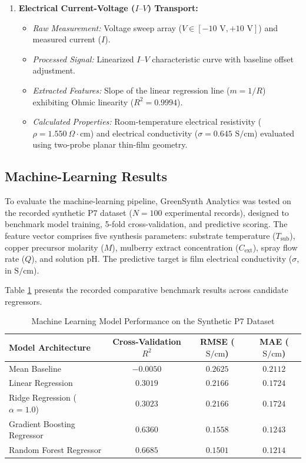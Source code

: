 \documentclass[12pt,a4paper,oneside]{report}
\begin{document}
{{{\begin{enumerate}
    \item \textbf{Electrical Current-Voltage ($I\text{--}V$) Transport:}
    \begin{itemize}
        \item \textit{Raw Measurement:} Voltage sweep array ($V \in [-10\text{ V}, +10\text{ V}]$) and measured current ($I$).
        \item \textit{Processed Signal:} Linearized $I\text{--}V$ characteristic curve with baseline offset adjustment.
        \item \textit{Extracted Features:} Slope of the linear regression line ($m = 1/R$) exhibiting Ohmic linearity ($R^2 = 0.9994$).
        \item \textit{Calculated Properties:} Room-temperature electrical resistivity ($\rho = 1.550\ \Omega\cdot\text{cm}$) and electrical conductivity ($\sigma = 0.645\text{ S/cm}$) evaluated using two-probe planar thin-film geometry.
    \end{itemize}
\end{enumerate}

\subsection{Machine-Learning Results}

To evaluate the machine-learning pipeline, GreenSynth Analytics was tested on the recorded synthetic P7 dataset ($N = 100$ experimental records), designed to benchmark model training, 5-fold cross-validation, and predictive scoring. The feature vector comprises five synthesis parameters: substrate temperature ($T_{\text{sub}}$), copper precursor molarity ($M$), mulberry extract concentration ($C_{\text{ext}}$), spray flow rate ($Q$), and solution pH. The predictive target is film electrical conductivity ($\sigma$, in $\text{S/cm}$).

Table \ref{tab:ml_benchmark} presents the recorded comparative benchmark results across candidate regressors.

\begin{table}[!htbp]
\centering
\footnotesize
\setlength{\tabcolsep}{8pt}
\renewcommand{\arraystretch}{1.2}
\caption{Machine Learning Model Performance on the Synthetic P7 Dataset}
\label{tab:ml_benchmark}
\begin{tabular}{|l|c|c|c|}
\hline
\textbf{Model Architecture} & \textbf{Cross-Validation $R^2$} & \textbf{RMSE ($\text{S/cm}$)} & \textbf{MAE ($\text{S/cm}$)} \\
\hline
Mean Baseline & $-0.0050$ & $0.2625$ & $0.2112$ \\
Linear Regression & $0.3019$ & $0.2166$ & $0.1724$ \\
Ridge Regression ($\alpha = 1.0$) & $0.3023$ & $0.2166$ & $0.1724$ \\
Gradient Boosting Regressor & $0.6360$ & $0.1558$ & $0.1243$ \\
Random Forest Regressor & $\mathbf{0.6685}$ & $\mathbf{0.1501}$ & $\mathbf{0.1214}$ \\
\hline
\end{tabular}
\end{table}

}}}
\end{document}
